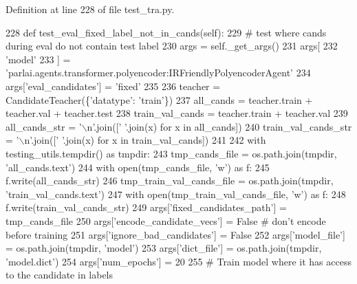 Definition at line 228 of file test\+\_\+tra.\+py.


\begin{DoxyCode}
228     \textcolor{keyword}{def }test\_eval\_fixed\_label\_not\_in\_cands(self):
229         \textcolor{comment}{# test where cands during eval do not contain test label}
230         args = self.\_get\_args()
231         args[
232             \textcolor{stringliteral}{'model'}
233         ] = \textcolor{stringliteral}{'parlai.agents.transformer.polyencoder:IRFriendlyPolyencoderAgent'}
234         args[\textcolor{stringliteral}{'eval\_candidates'}] = \textcolor{stringliteral}{'fixed'}
235 
236         teacher = CandidateTeacher(\{\textcolor{stringliteral}{'datatype'}: \textcolor{stringliteral}{'train'}\})
237         all\_cands = teacher.train + teacher.val + teacher.test
238         train\_val\_cands = teacher.train + teacher.val
239         all\_cands\_str = \textcolor{stringliteral}{'\(\backslash\)n'}.join([\textcolor{stringliteral}{' '}.join(x) \textcolor{keywordflow}{for} x \textcolor{keywordflow}{in} all\_cands])
240         train\_val\_cands\_str = \textcolor{stringliteral}{'\(\backslash\)n'}.join([\textcolor{stringliteral}{' '}.join(x) \textcolor{keywordflow}{for} x \textcolor{keywordflow}{in} train\_val\_cands])
241 
242         with testing\_utils.tempdir() \textcolor{keyword}{as} tmpdir:
243             tmp\_cands\_file = os.path.join(tmpdir, \textcolor{stringliteral}{'all\_cands.text'})
244             with open(tmp\_cands\_file, \textcolor{stringliteral}{'w'}) \textcolor{keyword}{as} f:
245                 f.write(all\_cands\_str)
246             tmp\_train\_val\_cands\_file = os.path.join(tmpdir, \textcolor{stringliteral}{'train\_val\_cands.text'})
247             with open(tmp\_train\_val\_cands\_file, \textcolor{stringliteral}{'w'}) \textcolor{keyword}{as} f:
248                 f.write(train\_val\_cands\_str)
249             args[\textcolor{stringliteral}{'fixed\_candidates\_path'}] = tmp\_cands\_file
250             args[\textcolor{stringliteral}{'encode\_candidate\_vecs'}] = \textcolor{keyword}{False}  \textcolor{comment}{# don't encode before training}
251             args[\textcolor{stringliteral}{'ignore\_bad\_candidates'}] = \textcolor{keyword}{False}
252             args[\textcolor{stringliteral}{'model\_file'}] = os.path.join(tmpdir, \textcolor{stringliteral}{'model'})
253             args[\textcolor{stringliteral}{'dict\_file'}] = os.path.join(tmpdir, \textcolor{stringliteral}{'model.dict'})
254             args[\textcolor{stringliteral}{'num\_epochs'}] = 20
255             \textcolor{comment}{# Train model where it has access to the candidate in labels}

\end{DoxyCode}
